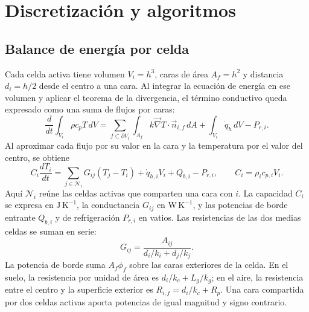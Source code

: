 \section{Discretización y algoritmos}
\label{sec:discretizacion}

\subsection{Balance de energía por celda}
Cada celda activa tiene volumen $V_i=h^3$, caras de área $A_f=h^2$ y distancia $d_i=h/2$ desde el centro a una cara. Al integrar la ecuación de energía en ese volumen y aplicar el teorema de la divergencia, el término conductivo queda expresado como una suma de flujos por caras:
\begin{equation}
  \frac{d}{dt}\int_{V_i}\rho c_pT\,dV
  =\sum_{f\subset\partial V_i}\int_{A_f}
  k\vec{\nabla}T\cdot\vec{n}_{i,f}\,dA
  +\int_{V_i}\dot q_h\,dV-P_{r,i}.
  \label{eq:balance-integral-celda}
\end{equation}
Al aproximar cada flujo por su valor en la cara y la temperatura por el valor del centro, se obtiene
\begin{equation}
  C_i\frac{dT_i}{dt}
  =\sum_{j\in\mathcal N_i}G_{ij}(T_j-T_i)
   +\dot q_{h,i}V_i+Q_{b,i}-P_{r,i},
  \qquad C_i=\rho_i c_{p,i}V_i.
  \label{eq:balance-celda}
\end{equation}
Aquí $\mathcal N_i$ reúne las celdas activas que comparten una cara con $i$. La capacidad $C_i$ se expresa en $\mathrm{J\,K^{-1}}$, la conductancia $G_{ij}$ en $\mathrm{W\,K^{-1}}$, y las potencias de borde entrante $Q_{b,i}$ y de refrigeración $P_{r,i}$ en vatios. Las resistencias de las dos medias celdas se suman en serie:
\begin{equation}
  G_{ij}=\frac{A_{ij}}{d_i/k_i+d_j/k_j}.
  \label{eq:conductancia-vecinos}
\end{equation}
La potencia de borde suma $A_f\phi_f$ sobre las caras exteriores de la celda. En el suelo, la resistencia por unidad de área es $d_i/k_c+L_g/k_g$; en el aire, la resistencia entre el centro y la superficie exterior es $R_{i,f}=d_i/k_c+R_p$. Una cara compartida por dos celdas activas aporta potencias de igual magnitud y signo contrario.

